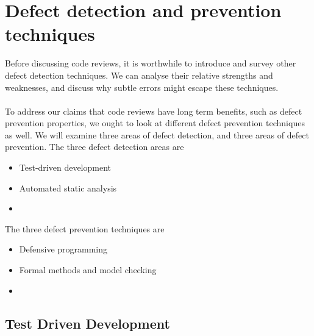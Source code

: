 \chapter{Defect detection and prevention techniques} \label{chap:otherdets}

Before discussing code reviews, it is worthwhile to introduce and survey other defect
detection techniques.
We can analyse their relative strengths and weaknesses, and discuss why subtle
errors might escape these techniques.\\
\\
To address our claims that code reviews have long term benefits, such as defect
prevention properties, we ought to look at different defect prevention
techniques as well.
We will examine three areas of defect detection, and three areas of defect
prevention.
The three defect detection areas are
\begin{itemize}
  \item Test-driven development
  \item Automated static analysis
  \item 
\end{itemize}
The three defect prevention techniques are
\begin{itemize}
  \item Defensive programming
  \item Formal methods and model checking
  \item 
\end{itemize}

\section{Test Driven Development} \label{sec:otherdets:testDD}

